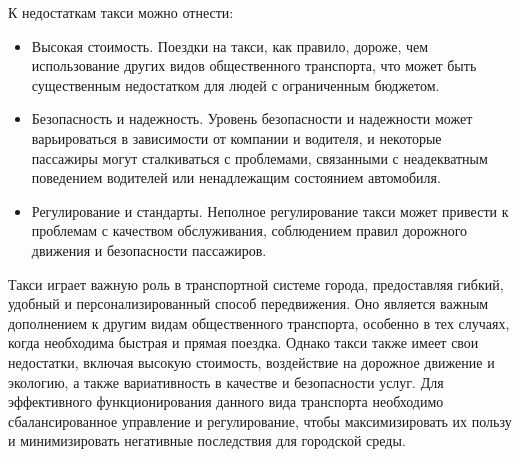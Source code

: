 К недостаткам такси можно отнести:
\begin{itemize}
	\item Высокая стоимость. Поездки на такси, как правило, дороже, чем использование других видов общественного транспорта, что может быть существенным недостатком для людей с ограниченным бюджетом.
	\item Безопасность и надежность. Уровень безопасности и надежности может варьироваться в зависимости от компании и водителя, и некоторые пассажиры могут сталкиваться с проблемами, связанными с неадекватным поведением водителей или ненадлежащим состоянием автомобиля.
	\item Регулирование и стандарты. Неполное регулирование такси может привести к проблемам с качеством обслуживания, соблюдением правил дорожного движения и безопасности пассажиров.
\end{itemize}

Такси играет важную роль в транспортной системе города, предоставляя гибкий, удобный и персонализированный способ передвижения. Оно является важным дополнением к другим видам общественного транспорта, особенно в тех случаях, когда необходима быстрая и прямая поездка. Однако такси также имеет свои недостатки, включая высокую стоимость, воздействие на дорожное движение и экологию, а также вариативность в качестве и безопасности услуг. Для эффективного функционирования данного вида транспорта необходимо сбалансированное управление и регулирование, чтобы максимизировать их пользу и минимизировать негативные последствия для городской среды.